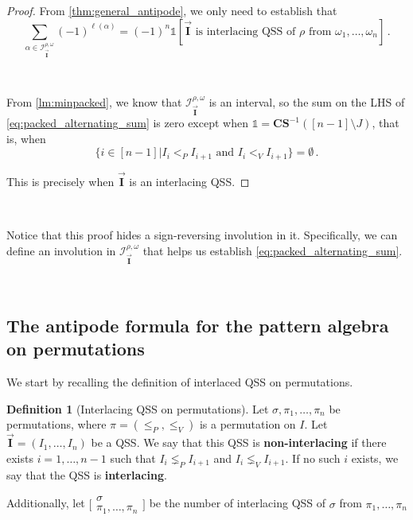 \documentclass[12pt, reqno]{amsart}
\theoremstyle{definition}
\newtheorem{defin}[thm]{Definition}
\newcommand{\III}{\vec{\mathbf{I}}}
\begin{document}
\begin{proof}
From \cref{thm:general_antipode}, we only need to establish that
\begin{equation}\label{eq:packed_alternating_sum}
\sum_{\alpha\in \mathcal I^{\rho, \omega}_{\III}} (-1)^{\ell (\alpha)} = (-1)^n \mathbb{1}[\III \text{ is interlacing QSS of $\rho$ from } \omega_1, \dots, \omega_n]\, .      
\end{equation}

\

From \cref{lm:minpacked}, we know that $\mathcal I^{\rho, \omega}_{\III}$ is an interval, so the sum on the LHS of \eqref{eq:packed_alternating_sum} is zero except when $\mathbb{1} = \mathbf{CS}^{-1}([n-1]\setminus J)$, that is, when 
$$\{i \in [n-1] | I_i <_P I_{i+1} \text{ and } I_i <_V I_{i+1} \} = \emptyset \, .$$

This is precisely when $\III$ is an interlacing QSS.
\end{proof}

\

Notice that this proof hides a sign-reversing involution in it.
Specifically, we can define an involution in $\mathcal I^{\rho, \omega}_{\III}$ that helps us establish \eqref{eq:packed_alternating_sum}.

\

\subsection{The antipode formula for the pattern algebra on permutations\label{sec:formula_permutation}}
We start by recalling the definition of interlaced QSS on permutations.

\begin{defin}[Interlacing QSS on permutations]
Let $\sigma, \pi_1, \dots, \pi_n$ be permutations, where $\pi = (\leq_P, \leq_V)$ is a permutation on $I$.
Let $\III = (I_1, \dots, I_n)$ be a QSS.
We say that this QSS is \textbf{non-interlacing} if there exists $i = 1, \dots, n-1$ such that $I_i \lneq_P I_{i+1}$ and $I_i \lneq_V I_{i+1}$.
If no such $i$ exists, we say that the QSS is \textbf{interlacing}.

Additionally, let $ \bigl[\!\begin{smallmatrix} \sigma \\ \pi_1, \dots, \pi_n \end{smallmatrix}\!\bigr]$ be the number of interlacing QSS of $\sigma$ from $\pi_1, \dots, \pi_n$
\end{defin}
\end{document}
